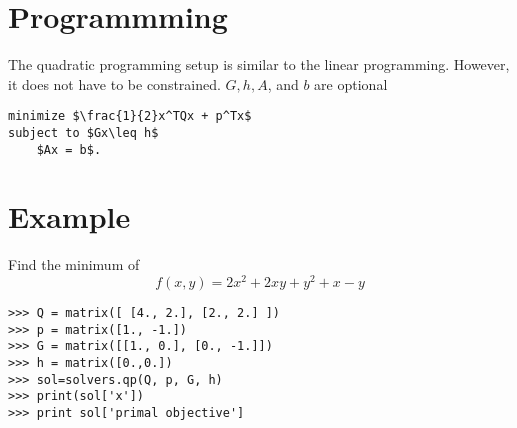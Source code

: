 \begin{comment}
>>> h = matrix([-7., -2., -4., -5., -8.,  0., 0., 0., 0., 0., 0.,])
>>> o = matrix([4., 7., 6., 8., 8., 9])
>>> sol = glpk.ilp(o,G,h)
>>> print sol[1]
\end{lstlisting} 

or 
\begin{lstlisting}
>>> from cvxopt import matrix, solvers, glpk
>>> G = matrix([ [-1., 0., 0., 0., 0., 0.],
             [0., -1., 0., 0., 0., 0.],
             [0., 0., -1., 0., 0., 0.],
             [0., 0., 0., -1., 0., 0.],
             [0., 0., 0., 0., -1., 0.],
             [0., 0., 0., 0., 0., -1.] ])

>>> h = matrix([ 0., 0., 0., 0., 0., 0.,])
>>> o = matrix([4., 7., 6., 8., 8., 9])
>>> A = matrix([ [1., 0., 0., 1., 0.],
             [1., 0., 0., 0., 1.],
             [0., 1., 0., 1., 0.],
             [0., 1., 0., 0., 1.],
             [0., 0., 1., 1., 0.],
             [0., 0., 1., 0., 1.] ])
>>> b = matrix([7., 2., 4., 5., 8])
>>> sol = glpk.ilp(o,G,h,A,b)
>>> print sol[1]
\end{lstlisting} 

\textbf{Problem 2}
Choose one of these methods and compare the optimal values for the integer linear program to the result you received above. 

\textbf{Problem 3}
Create the dual problem for the linear program and solve. 
Compare your answer to the dual value cvxopt returned. 
\end{comment}
\section*{Programmming}

The quadratic programming setup is similar to the linear programming.
However, it does not have to be constrained.
$G, h, A$, and $b$ are optional

\begin{lstlisting}[mathescape]
minimize $\frac{1}{2}x^TQx + p^Tx$
subject to $Gx\leq h$
	$Ax = b$.
\end{lstlisting}

\section*{Example}
Find the minimum of 
\begin{equation}
f(x,y) = 2x^2 +2xy + y^2 +x -y
\end{equation}
\begin{lstlisting}
>>> Q = matrix([ [4., 2.], [2., 2.] ])
>>> p = matrix([1., -1.])
>>> G = matrix([[1., 0.], [0., -1.]])
>>> h = matrix([0.,0.])
>>> sol=solvers.qp(Q, p, G, h)
>>> print(sol['x'])
>>> print sol['primal objective']
\end{lstlisting}

